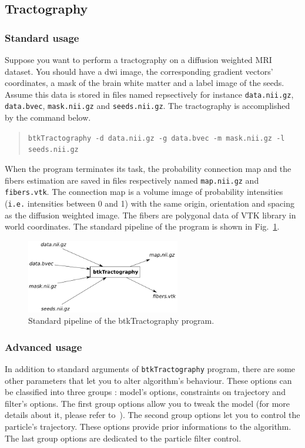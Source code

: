 \subsection{Tractography}
\label{subsec:tracto}
    \subsubsection*{Standard usage}
        Suppose you want to perform a tractography on a diffusion weighted MRI dataset. You should have a dwi image, the corresponding gradient vectors' coordinates, a mask of the brain white matter and a label image of the seeds. Assume this data is stored in files named repsectively for instance \texttt{data.nii.gz}, \texttt{data.bvec}, \texttt{mask.nii.gz} and \texttt{seeds.nii.gz}. The tractography is accomplished by the command below.
            \begin{quote}
                \texttt{btkTractography -d data.nii.gz -g data.bvec -m mask.nii.gz -l seeds.nii.gz}
            \end{quote}
        When the program terminates its task, the probability connection map and the fibers estimation are saved in files respectively named \texttt{map.nii.gz} and \texttt{fibers.vtk}. The connection map is a volume image of probability intensities (\texttt{i.e.} intensities between 0 and 1) with the same origin, orientation and spacing as the diffusion weighted image. The fibers are polygonal data of VTK library in world coordinates. The standard pipeline of the program is shown in Fig.~\ref{btkTractography-fig:standard-pipeline}.
            \begin{figure}
                \centering
                \includegraphics[width=0.6\textwidth]{btkTractographyPipeline}
                \caption{Standard pipeline of the btkTractography program.}
                \label{btkTractography-fig:standard-pipeline}
            \end{figure}

    \subsubsection*{Advanced usage}
        In addition to standard arguments of \texttt{btkTractography} program, there are some other parameters that let you to alter algorithm's behaviour. These options can be classified into three groups : model's options, constraints on trajectory and filter's options. The first group options allow you to tweak the model (for more details about it, please refer to~\cite{descoteaux_regularized_2007}). The second group options let you to control the particle's trajectory. These options provide prior informations to the algorithm. The last group options are dedicated to the particle filter control.

